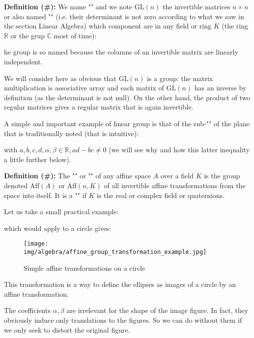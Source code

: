 	\textbf{Definition (\#\mydef):} We name "" and we note $\text{GL}(n)$ the invertible matrices $n\times n$ or also named "" (i.e. their determinant is not zero according to what we saw in the section Linear Algebra) which component are in any field or ring $K$ (the ring $\mathbb{R}$ or the grup $\mathbb{C}$ most of time):
	
	he group is so named because the columns of an invertible matrix are linearly independent.
	
	We will consider here as obvious that $\text{GL}(n)$ is a group: the matrix multiplication is associative array and each matrix of $\text{GL} (n)$ has an inverse by definition (as the determinant is not null). On the other hand, the product of two regular matrices gives a regular matrix that is again invertible.
	
	A simple and important example of linear group is that of the sub-"" of the plane that is traditionally noted (that is intuitive):
	
	with $a,b,c,d,\alpha,\beta\in \mathbb{R},ad-bc\neq 0$ (we will see why and how this latter inequality a little further below).
	
	\textbf{Definition (\#\mydef):} The "" or "" of any affine space $A$ over a field $K$ is the group denoted $\text{Aff}(A)$ or $\text{Aff}(n,K)$ of all invertible affine transformations from the space into itself. It is a "" if $K$ is the real or complex field or quaternions.
	
	Let us take a small practical example:
	
	which would apply to a circle gives:
	\begin{figure}[H]
			\centering
			\texttt{[image: img/algebra/affine\_group\_transformation\_example.jpg]}
			\caption{Simple affine transformations on a circle}
		\end{figure}
	This transformation is a way to define the ellipses as images of a circle by an affine transformation.
	
	The coefficients $\alpha,\beta$ are irrelevant for the shape of the image figure. In fact, they obviously induce only translations to the figures. So we can do without them if we only seek to distort the original figure.
	
